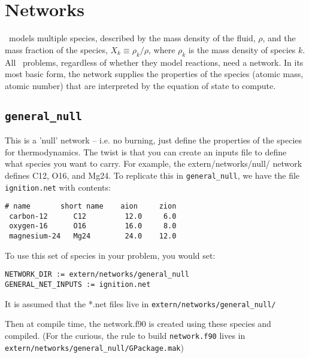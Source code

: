 \section{Networks}

\maestro\ models multiple species, described by the mass density of
the fluid, $\rho$, and the mass fraction of the species, $X_k \equiv
\rho_k/\rho$, where $\rho_k$ is the mass density of species $k$.  All
\maestro\ problems, regardless of whether they model reactions, need a
network.  In its most basic form, the network supplies the properties
of the species (atomic mass, atomic number) that are interpreted by
the equation of state to compute.

\subsection{{\tt general\_null}}

This is a 'null' network -- i.e. no burning, just define the
properties of the species for thermodynamics.  The twist is that you
can create an inputs file to define what species you want to carry.
For example, the extern/networks/null/ network defines C12, O16, and
Mg24.  To replicate this in {\tt general\_null}, we have the file
{\tt ignition.net} with contents:

\begin{verbatim}
# name       short name    aion     zion
 carbon-12      C12         12.0     6.0
 oxygen-16      O16         16.0     8.0
 magnesium-24   Mg24        24.0    12.0
\end{verbatim}

To use this set of species in your problem, you would set:

\begin{verbatim}
NETWORK_DIR := extern/networks/general_null
GENERAL_NET_INPUTS := ignition.net
\end{verbatim}

It is assumed that the *.net files live in {\tt extern/networks/general\_null/}

Then at compile time, the network.f90 is created using these species and
compiled.  (For the curious, the rule to build {\tt network.f90} lives in
{\tt extern/networks/general\_null/GPackage.mak})

